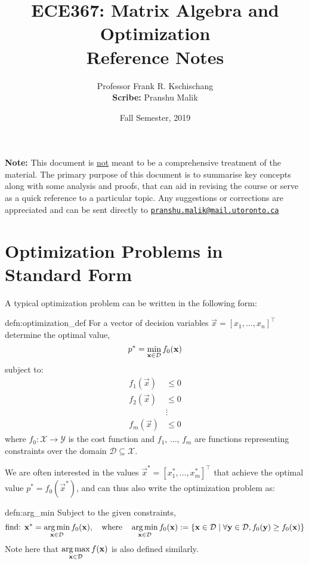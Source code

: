 \documentclass[10pt]{article}
\date{Fall Semester, 2019}
\begin{document}
\title{\textbf{\Large{\textsc{ECE367:} Matrix Algebra and Optimization}} \\ \Large{Reference Notes}\vspace{-0.3cm}}
\author{Professor Frank R. Kschischang\\\small{\textbf{Scribe:} Pranshu Malik}}

\maketitle
\tableofcontents
\blfootnote
{
    \textbf{Note:} This document is \underline{not} meant to be a comprehensive treatment of the material. The primary purpose of this document is to summarise key concepts along with some analysis and proofs, that can aid in revising the course or serve as a quick reference to a particular topic. Any suggestions or corrections are appreciated and can be sent directly to \texttt{\href{mailto:pranshu.malik@mail.utoronto.ca}{pranshu.malik@mail.utoronto.ca}}
}

\pagebreak

\section{Optimization Problems in Standard Form}

A typical optimization problem can be written in the following form:\\
\begin{defn}{defn:optimization_def}
    For a vector of decision variables $\vec{x} = [x_1, \ldots, x_n]^\top$ determine the optimal value,
    \[
        p^* = \min_{\vec{x} \in \mathcal{D}} f_0(\vec{x})\\
    \]
    subject to: 
    \begin{align*}
        f_1(\vec{x}) &\leq 0\\
        f_2(\vec{x}) &\leq 0\\
        &\vdots\\
        f_m(\vec{x}) &\leq 0
    \end{align*}
    where $f_0: \mathcal{X} \to \mathcal{Y}$ is the cost function and $f_1$, $\ldots$, $f_m$ are functions representing constraints over the domain $\mathcal{D}\subseteq \mathcal{X}$.
\end{defn}

We are often interested in the values $\vec{x}^* = [x_1^*, \ldots, x_m^*]^\top$ that achieve the optimal value $p^* = f_0(\vec{x}^*)$, and can thus also write the optimization problem as:\\
\begin{defn}{defn:arg_min}
    Subject to the given constraints, 
    \[
        \text{find: } \vec{x}^* = \argmin_{\vec{x} \in \mathcal{D}} f_0(\vec{x}), \quad \text{where} \quad \argmin_{\vec{x} \in \mathcal{D}} f_0(\vec{x}) := \{\vec{x} \in \mathcal{D} \mid \forall \vec{y} \in \mathcal{D}, f_0(\vec{y}) \geq f_0(\vec{x})\}
    \]
    Note here that $\displaystyle{\argmax_{\vec{x} \in \mathcal{D}} f(\vec{x})}$ is also defined similarly.
\end{defn}
\end{document}
